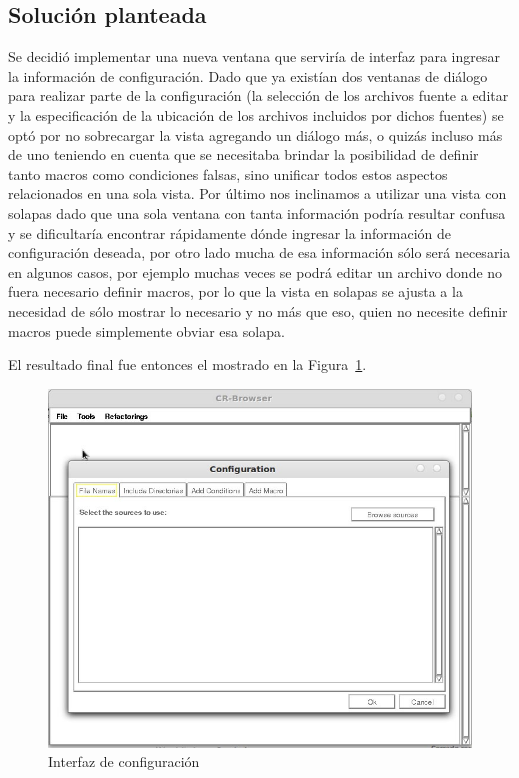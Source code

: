 \documentclass[a4paper,oneside,12pt]{article}
\begin{document}
\subsection{Soluci\'on planteada}
Se decidi\'o implementar una nueva ventana que servir\'ia de interfaz para ingresar la informaci\'on de configuraci\'on. Dado que ya exist\'ian dos ventanas de di\'alogo para realizar parte de la configuraci\'on (la selecci\'on de los archivos fuente a editar y la especificaci\'on de la ubicaci\'on de los archivos incluidos por dichos fuentes) se opt\'o por no sobrecargar la vista agregando un di\'alogo m\'as, o quiz\'as incluso m\'as de uno teniendo en cuenta que se necesitaba brindar la posibilidad de definir tanto macros como condiciones falsas, sino unificar todos estos aspectos relacionados en una sola vista. Por \'ultimo nos inclinamos a utilizar una vista  con solapas dado que una sola ventana con tanta informaci\'on podr\'ia resultar confusa y se dificultar\'ia encontrar r\'apidamente d\'onde ingresar la informaci\'on de configuraci\'on deseada, por otro lado mucha de esa informaci\'on s\'olo ser\'a necesaria en algunos casos, por ejemplo muchas veces se podr\'a editar un archivo donde no fuera necesario definir macros, por lo que la vista en solapas se ajusta a la necesidad de s\'olo mostrar lo necesario y no m\'as que eso, quien no necesite definir macros puede simplemente obviar esa solapa.

El resultado final fue entonces el mostrado en la Figura~\ref{configuracion}.

\begin{figure}[h!]
  \centering
    \includegraphics[scale=0.45]{images/codigo_modificado/configuracion.jpg}
     \caption{Interfaz de configuraci\'on}
     \label{configuracion}
\end{figure}
\end{document}
